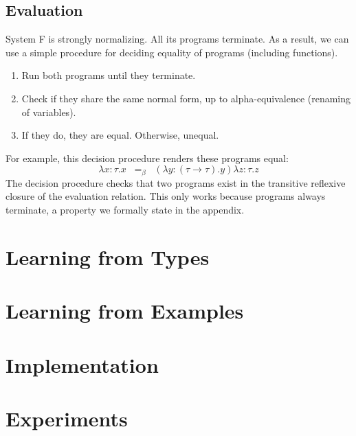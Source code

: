 \documentclass[acmsmall]{acmart}
\theoremstyle{mytheoremstyle}
\begin{document}
\subsection{Evaluation}
System F is strongly normalizing. All its programs terminate. As a result, we can use a simple procedure for deciding equality of programs (including functions). 
\begin{enumerate}
\item Run both programs until they terminate.
\item Check if they share the same normal form, up to alpha-equivalence (renaming of variables).
\item If they do, they are equal. Otherwise, unequal.
\end{enumerate}
For example, this decision procedure renders these programs equal:
$$\lambda x\!:\!\tau.x \;\;=_\beta\;\; (\lambda y\!:\!(\tau\to\tau).y)\lambda z\!:\!\tau.z$$
The decision procedure checks that two programs exist in the transitive reflexive closure of the evaluation relation. This only works because programs always terminate, a property we formally state in the appendix.

\section{Learning from Types}

\section{Learning from Examples}

\section{Implementation}

\section{Experiments}
\end{document}
